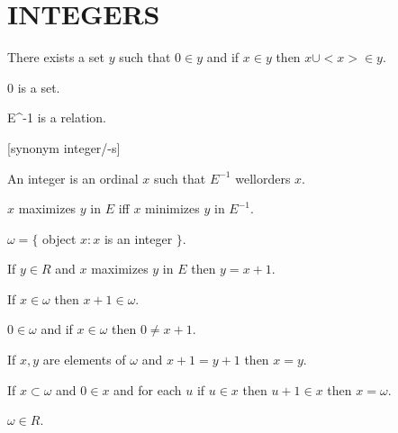 \documentclass[a4paper,draft]{amsproc}
\begin{document}
\section{INTEGERS}
\begin{forthel}

\begin{axiom}[VIII]
There exists a set $y$ such that $0 \in y$ and if $x \in y$ then $x \cup <x> \in y$.
\end{axiom}

\begin{lemma}
0 is a set.
\end{lemma}

\begin{lemma}
E^{-1} is a relation.
\end{lemma}


[synonym integer/-s]
\begin{definition}[129]
An integer is an ordinal $x$ such that $E^{-1}$ wellorders $x$.
\end{definition}

\begin{definition}[130]
$x$ maximizes $y$ in $E$ iff $x$ minimizes $y$ in $E^{-1}$.
\end{definition}

\begin{definition}[131]
$\omega = \{$ object $x : x$ is an integer $\}.$
\end{definition}


\begin{theorem}[133]
If $y \in R$ and $x$ maximizes $y$ in $E$ then $y = x + 1$.
\end{theorem}

\begin{theorem}[134]
If $x \in \omega$ then $x + 1 \in \omega$.
\end{theorem}

\begin{theorem}[135]
$0 \in \omega$ and if $x \in \omega$ then $0 \neq x + 1$.
\end{theorem}

\begin{theorem}[136]
If $x, y$ are elements of $\omega$ and $x + 1 = y + 1$ then $x = y$.
\end{theorem}

\begin{theorem}[137]
If $x \subset \omega$ and $0 \in x$ and for each $u$ if $u \in x$ then $u + 1 \in x$ then $x = \omega$.
\end{theorem}

\begin{theorem}[138]
$\omega \in R$.
\end{theorem}

\end{forthel}
\end{document}
